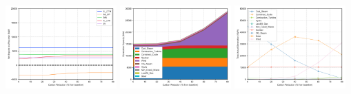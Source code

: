 \documentclass[xcolor=dvipsnames]{beamer}
\begin{document}
\begin{frame}
  \includegraphics[width=0.32\textwidth]{includes/no_leakage_no_shutdowns_agg_exim.png}
  \includegraphics[width=0.32\textwidth]{includes/no_leakage_no_shutdowns_agg_capacity_cntlreg.png}
  \includegraphics[width=0.32\textwidth]{includes/no_leakage_no_shutdowns_agg_generation_cntlreg.png}

\end{frame}
\end{document}
